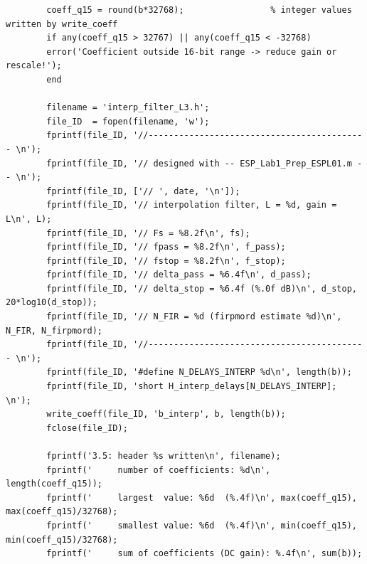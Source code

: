 \documentclass[a4paper,11pt]{article}
\begin{document}
	\begin{lstlisting}[style=matlab, caption={MATLAB code, Section 3.5}, label={lst:m35}]
		%% 3.5 Export filter coefficients to a C header file
		coeff_q15 = round(b*32768);                 % integer values written by write_coeff
		if any(coeff_q15 > 32767) || any(coeff_q15 < -32768)
		error('Coefficient outside 16-bit range -> reduce gain or rescale!');
		end
		
		filename = 'interp_filter_L3.h';
		file_ID  = fopen(filename, 'w');
		fprintf(file_ID, '//------------------------------------------- \n');
		fprintf(file_ID, '// designed with -- ESP_Lab1_Prep_ESPL01.m -- \n');
		fprintf(file_ID, ['// ', date, '\n']);
		fprintf(file_ID, '// interpolation filter, L = %d, gain = L\n', L);
		fprintf(file_ID, '// Fs = %8.2f\n', fs);
		fprintf(file_ID, '// fpass = %8.2f\n', f_pass);
		fprintf(file_ID, '// fstop = %8.2f\n', f_stop);
		fprintf(file_ID, '// delta_pass = %6.4f\n', d_pass);
		fprintf(file_ID, '// delta_stop = %6.4f (%.0f dB)\n', d_stop, 20*log10(d_stop));
		fprintf(file_ID, '// N_FIR = %d (firpmord estimate %d)\n', N_FIR, N_firpmord);
		fprintf(file_ID, '//------------------------------------------- \n');
		fprintf(file_ID, '#define N_DELAYS_INTERP %d\n', length(b));
		fprintf(file_ID, 'short H_interp_delays[N_DELAYS_INTERP]; \n');
		write_coeff(file_ID, 'b_interp', b, length(b));
		fclose(file_ID);
		
		fprintf('3.5: header %s written\n', filename);
		fprintf('     number of coefficients: %d\n', length(coeff_q15));
		fprintf('     largest  value: %6d  (%.4f)\n', max(coeff_q15), max(coeff_q15)/32768);
		fprintf('     smallest value: %6d  (%.4f)\n', min(coeff_q15), min(coeff_q15)/32768);
		fprintf('     sum of coefficients (DC gain): %.4f\n', sum(b));
	\end{lstlisting}
	
\end{document}
